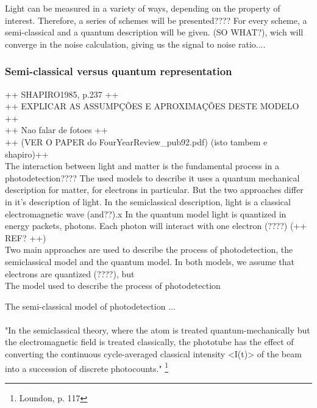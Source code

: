 \begin{bibunit}[plain]
Light can be measured in a variety of ways, depending on the property of interest. 
Therefore, a series of schemes will be presented????
For every scheme, a semi-classical and a quantum description will be given. (SO WHAT?), wich will converge in the noise calculation, giving us the signal to noise ratio....





\subsubsection{Semi-classical versus quantum representation}

++ SHAPIRO1985, p.237 ++\\
++ EXPLICAR AS ASSUMPÇÕES E APROXIMAÇÕES DESTE MODELO ++\\
++ Nao falar de fotoes ++\\
++ (VER O PAPER do FourYearReview\_pub92.pdf) (isto tambem e shapiro)++\\

The interaction between light and matter is the fundamental process in a photodetection???? The used models to describe it uses a quantum mechanical description for matter, for electrons in particular. But the two approaches differ in it's description of light. In the semiclassical description, light is a classical electromagnetic wave (and??).x
In the quantum model light is quantized in energy packets, photons. Each photon will interact with one electron (????) (++ REF? ++)\\

Two main approaches are used to describe the process of photodetection, the semiclassical model and the quantum model. In both models, we assume that electrons are quantized (????), but 
\\

The model used to describe the process of photodetection 

The semi-classical model of photodetection ...\\
\\

"In the semiclassical theory, where the atom is treated quantum-mechanically but the electromagnetic field is treated classically, the phototube has the effect of converting the continuous cycle-averaged classical intensity <I(t)> of the beam into a succession of discrete photocounts."
\footnote{Loundon, p. 117}\\


\end{bibunit}
